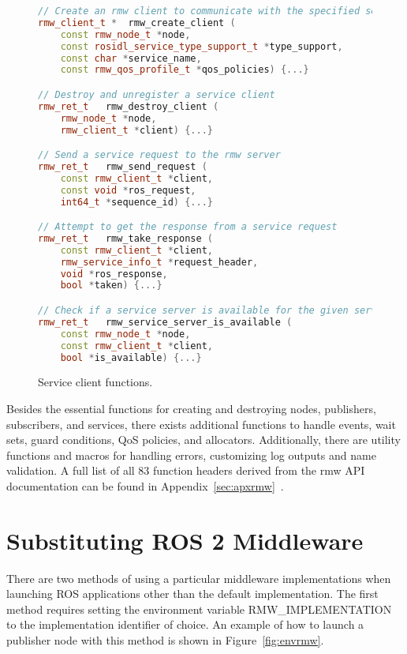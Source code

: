         \begin{figure}[htbp]
            \begin{lstlisting}[language=C++]
// Create an rmw client to communicate with the specified service
rmw_client_t * 	rmw_create_client (
    const rmw_node_t *node, 
    const rosidl_service_type_support_t *type_support, 
    const char *service_name, 
    const rmw_qos_profile_t *qos_policies) {...}

// Destroy and unregister a service client
rmw_ret_t 	rmw_destroy_client (
    rmw_node_t *node, 
    rmw_client_t *client) {...}

// Send a service request to the rmw server
rmw_ret_t 	rmw_send_request (
    const rmw_client_t *client, 
    const void *ros_request, 
    int64_t *sequence_id) {...}

// Attempt to get the response from a service request
rmw_ret_t 	rmw_take_response (
    const rmw_client_t *client, 
    rmw_service_info_t *request_header, 
    void *ros_response, 
    bool *taken) {...}

// Check if a service server is available for the given service client
rmw_ret_t 	rmw_service_server_is_available (
    const rmw_node_t *node, 
    const rmw_client_t *client, 
    bool *is_available) {...}
\end{lstlisting}
            \caption{Service client functions.}
            \label{fig:funclient}
        \end{figure}


    \pagebreak
    Besides the essential functions for creating and destroying nodes, publishers, subscribers, and services, there exists additional functions to handle events, wait sets, guard conditions, \ac{QoS} policies, and allocators. Additionally, there are utility functions and macros for handling errors, customizing log outputs and name validation. A full list of all 83 function headers derived from the \textsf{rmw} \ac{API} documentation can be found in Appendix~\ref{sec:apxrmw}~\cite{rmwapi}.

\section{Substituting ROS 2 Middleware}

    There are two methods of using a particular middleware implementations when launching \ac{ROS} applications other than the default implementation. The first method requires setting the environment variable \small\textsf{RMW\_IMPLEMENTATION} to the implementation identifier of choice. An example of how to launch a publisher node with this method is shown in Figure~\ref{fig:envrmw}.

